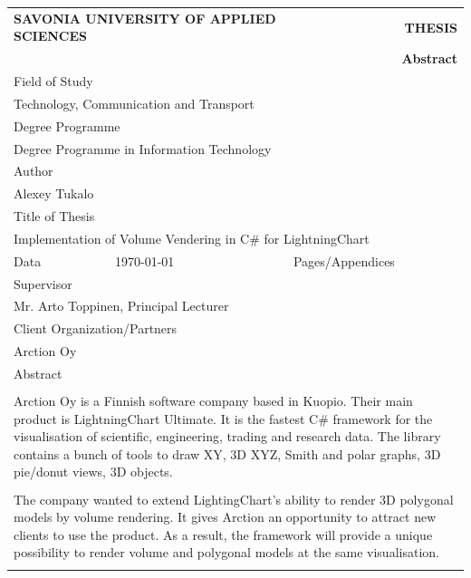 \documentclass[twoside, english, 11pt]{report}
\begin{document}
\begin{table}[!h]
\begin{tabular}{| l | l | l | l |}
\multicolumn{2}{l}{\textbf{SAVONIA UNIVERSITY OF APPLIED SCIENCES}}&
\multicolumn{2}{r}{\textbf{THESIS}}\\
\multicolumn{4}{r}{\textbf{Abstract}}\\
\hline
\multicolumn{4}{|l|}{Field of Study}\\
\multicolumn{4}{|l|}{Technology, Communication and Transport}\\
\hline
\multicolumn{4}{|l|}{Degree Programme}\\
\multicolumn{4}{|l|}{Degree Programme in Information Technology}\\
\hline
\multicolumn{4}{|l|}{Author}\\
\multicolumn{4}{|l|}{Alexey Tukalo}\\
\hline
\multicolumn{4}{|l|}{Title of Thesis}\\
\multicolumn{4}{|l|}{Implementation of Volume Vendering in C\# for LightningChart}\\
\hline
Data & \today & Pages/Appendices & \pageref{LastPage}\\
\hline
\multicolumn{4}{|l|}{Supervisor}\\
\multicolumn{4}{|l|}{Mr. Arto Toppinen, Principal Lecturer}\\
\hline
\multicolumn{4}{|l|}{Client Organization/Partners}\\
\multicolumn{4}{|l|}{Arction Oy}\\
\hline
\multicolumn{4}{|l|}{Abstract}\\
\multicolumn{4}{|l|}{ }\\
\multicolumn{4}{|p{14cm}|}{
Arction Oy is a Finnish software company based in Kuopio. Their main product is LightningChart Ultimate. It is the fastest C\# framework for the visualisation of scientific, engineering, trading and research data. The library contains a bunch of tools to draw XY, 3D XYZ, Smith and polar graphs, 3D pie/donut views, 3D objects.
}\\
\multicolumn{4}{|l|}{ }\\
\multicolumn{4}{|p{14cm}|}{
The company wanted to extend LightingChart's ability to render 3D polygonal models by volume rendering. It gives Arction an opportunity to attract new clients to use the product. As a result, the framework will provide a unique possibility to render volume and polygonal models at the same visualisation.
}\\
\multicolumn{4}{|l|}{ }\\

\end{tabular}
\end{table}
\end{document}
